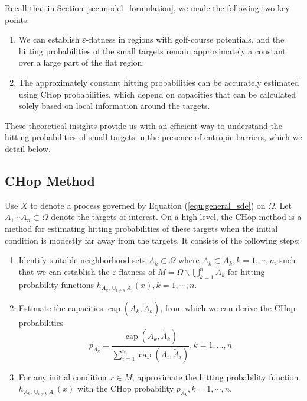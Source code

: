 \documentclass[english, aip, jcp, priprint, graphicx,floatfix]{revtex4-1}
\theoremstyle{plain}
\theoremstyle{definition}
\theoremstyle{plain}
\begin{document}
Recall that in Section \ref{sec:model_formulation}, we made the following two key points:

\begin{enumerate}[noitemsep]
    \item We can establish $\varepsilon$-flatness in regions with golf-course potentials, and the hitting probabilities of the small targets remain approximately a constant over a large part of the flat region.
    \item The approximately constant hitting probabilities can be accurately estimated using CHop probabilities, which depend on capacities that can be calculated solely based on local information around the targets.
\end{enumerate}

These theoretical insights provide us with an efficient way to understand the hitting probabilities of small targets in the presence of entropic barriers, which we detail below.

\subsection{CHop Method}

Use $X$ to denote a process governed by Equation (\ref{equ:general_sde}) on $\Omega$.  Let $A_1\cdots A_n \subset \Omega$ denote the targets of interest.  On a high-level, the CHop method is a method for estimating hitting probabilities of these targets when the initial condition is modestly far away from the targets.  It consists of the following steps:

\begin{enumerate}[noitemsep]
    \item Identify suitable neighborhood sets $\tilde A_k \subset \Omega$ where $A_k \subset \tilde{A}_k, k=1, \cdots, n$, such that we can establish the $\varepsilon$-flatness of $M = \Omega \backslash \bigcup_{k = 1}^n \tilde{A}_k $ for hitting probability functions $h_{A_k,\cup_{i\neq k} A_i}(x), k=1, \cdots, n$.
    \item Estimate the capacities $\ensuremath{\operatorname{cap}} (A_k, \tilde{A}_k)$, from which we can derive the CHop probabilities
\begin{equation*}
p_{A_k} = \frac{\ensuremath{\operatorname{cap}} (A_k, \tilde{A}_k)}{\sum_{i = 1}^n \ensuremath{\operatorname{cap}} (A_i, \tilde{A}_i)}, k=1,\dots, n
\end{equation*} 
    \item For any initial condition $x \in M$, approximate the hitting probability function $h_{A_k,\cup_{i\neq k} A_i}(x)$ with the CHop probability $p_{A_k}, k=1, \cdots, n$.  
\end{enumerate}
\end{document}
